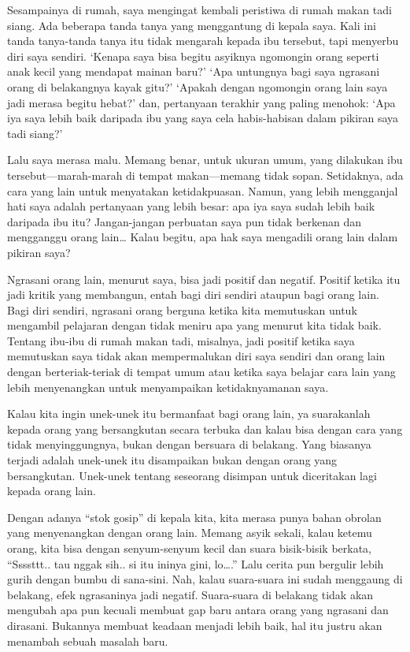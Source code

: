 Sesampainya di rumah, saya mengingat kembali peristiwa di rumah makan tadi siang. Ada beberapa tanda tanya yang menggantung di kepala saya. Kali ini tanda tanya-tanda tanya itu tidak mengarah kepada ibu tersebut, tapi menyerbu diri saya sendiri. 
‘Kenapa saya bisa begitu asyiknya ngomongin orang seperti anak kecil yang mendapat mainan baru?’ 
‘Apa untungnya bagi saya ngrasani orang di belakangnya kayak gitu?’
‘Apakah dengan ngomongin orang lain saya jadi merasa begitu hebat?’
dan, pertanyaan terakhir yang paling menohok:
‘Apa iya saya lebih baik daripada ibu yang saya cela habis-habisan dalam pikiran saya tadi siang?’

Lalu saya merasa malu. Memang benar, untuk ukuran umum, yang dilakukan ibu tersebut—marah-marah di tempat makan—memang tidak sopan. Setidaknya, ada cara yang lain untuk menyatakan ketidakpuasan. Namun, yang lebih mengganjal hati saya adalah pertanyaan yang lebih besar: apa iya saya sudah lebih baik daripada ibu itu? Jangan-jangan perbuatan saya pun tidak berkenan dan mengganggu orang lain… Kalau begitu, apa hak saya mengadili orang lain dalam pikiran saya?

Ngrasani orang lain, menurut saya, bisa jadi positif dan negatif.
Positif ketika itu jadi kritik yang membangun, entah bagi diri sendiri ataupun bagi orang lain. 
Bagi diri sendiri, ngrasani orang berguna ketika kita memutuskan untuk mengambil pelajaran dengan tidak meniru apa yang menurut kita tidak baik. Tentang ibu-ibu di rumah makan tadi, misalnya, jadi positif ketika saya memutuskan saya tidak akan mempermalukan diri saya sendiri dan orang lain dengan berteriak-teriak di tempat umum atau ketika saya belajar cara lain yang lebih menyenangkan untuk menyampaikan ketidaknyamanan saya.

Kalau kita ingin unek-unek itu bermanfaat bagi orang lain, ya suarakanlah kepada orang yang bersangkutan secara terbuka dan kalau bisa dengan cara yang tidak menyinggungnya,
bukan dengan bersuara di belakang. Yang biasanya terjadi adalah unek-unek itu disampaikan bukan dengan orang yang bersangkutan. Unek-unek tentang seseorang disimpan untuk diceritakan lagi kepada orang lain. 

Dengan adanya ``stok gosip'' di kepala kita, kita merasa punya bahan obrolan yang menyenangkan dengan orang lain. Memang asyik sekali, kalau ketemu orang, kita bisa dengan senyum-senyum kecil dan suara bisik-bisik berkata, ``Ssssttt.. tau nggak sih.. si itu ininya gini, lo….'' Lalu cerita pun bergulir lebih gurih dengan bumbu di sana-sini. Nah, kalau suara-suara ini sudah menggaung di belakang, efek ngrasaninya jadi  negatif. Suara-suara di belakang tidak akan mengubah apa pun kecuali membuat gap baru antara orang yang ngrasani dan dirasani. Bukannya membuat keadaan menjadi lebih baik, hal itu justru akan menambah sebuah masalah baru.

